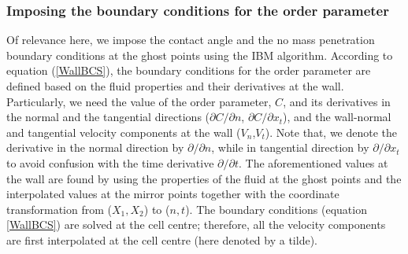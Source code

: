 \documentclass[review]{elsarticle}
\begin{document}
\subsubsection{Imposing the boundary conditions for the order parameter}

Of relevance here, we impose the contact angle and the no mass penetration boundary conditions at the ghost points using the IBM algorithm. %
According to equation (\ref{WallBCS}), the boundary conditions for the order parameter are defined based on the fluid properties and their derivatives at the wall. Particularly, we need the value of the order parameter, $C$, and its derivatives in the normal and the tangential directions ($\partial C/ \partial n$,  $\partial C/\partial {x_t}$), and the wall-normal and tangential velocity components at the wall  ($V_n$,$V_t$). 
Note that, we denote the derivative in the normal direction by $\partial / \partial n$, while in tangential direction by  $\partial / \partial x_t$ to avoid confusion with the time derivative $ \partial / \partial t$. The aforementioned values at the wall are found by using the properties of the fluid at the ghost points and the interpolated values at the mirror points together with the coordinate transformation from ($X_1, X_2$) to ($n,t$). The boundary conditions (equation \ref{WallBCS}) are solved at the cell centre; therefore, all the velocity components are first interpolated at the cell centre (here denoted by a tilde). 
\end{document}
